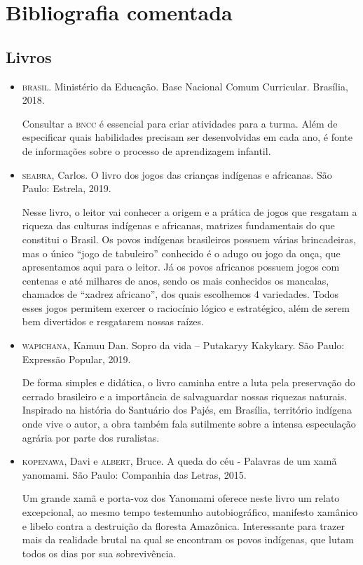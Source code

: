 \documentclass[11pt]{extarticle}
\begin{document}
\section{Bibliografia comentada}
\subsection{Livros}

\begin{itemize}
\item \textsc{brasil}. Ministério da Educação. Base Nacional Comum Curricular. Brasília, 2018.

Consultar a \textsc{bncc} é essencial para criar atividades para a turma. Além de especificar quais habilidades precisam ser desenvolvidas em cada ano, é fonte de informações sobre o processo de aprendizagem infantil. 

\item \textsc{seabra}, Carlos. O livro dos jogos das crianças indígenas e africanas. São Paulo: Estrela, 2019.

Nesse livro, o leitor vai conhecer a origem e a prática de jogos que resgatam a riqueza das culturas indígenas e africanas, matrizes fundamentais do que constitui o Brasil. Os povos indígenas brasileiros possuem várias brincadeiras, mas o único “jogo de tabuleiro” conhecido é o adugo ou jogo da onça, que apresentamos aqui para o leitor. Já os povos africanos possuem jogos com centenas e até milhares de anos, sendo os mais conhecidos os mancalas, chamados de “xadrez africano”, dos quais escolhemos 4 variedades. Todos esses jogos permitem exercer o raciocínio lógico e estratégico, além de serem bem divertidos e resgatarem nossas raízes.
 
\item \textsc{wapichana}, Kamuu Dan. Sopro da vida – Putakaryy Kakykary. São Paulo: Expressão Popular, 2019.

De forma simples e didática, o livro caminha entre a luta pela preservação do cerrado brasileiro e a importância de salvaguardar nossas riquezas naturais. Inspirado na história do Santuário dos Pajés, em Brasília, território indígena onde vive o autor, a obra também fala sutilmente sobre a intensa especulação agrária por parte dos ruralistas.

\item \textsc{kopenawa}, Davi e \textsc{albert}, Bruce. A queda do céu - Palavras de um xamã yanomami. São Paulo: Companhia das Letras, 2015.

Um grande xamã e porta-voz dos Yanomami oferece neste livro um relato excepcional, ao mesmo tempo testemunho autobiográfico, manifesto xamânico e libelo contra a destruição da floresta Amazônica. Interessante para trazer mais da realidade brutal na qual se encontram os povos indígenas, que lutam todos os dias por sua sobrevivência. 
\end{itemize}
\end{document}

